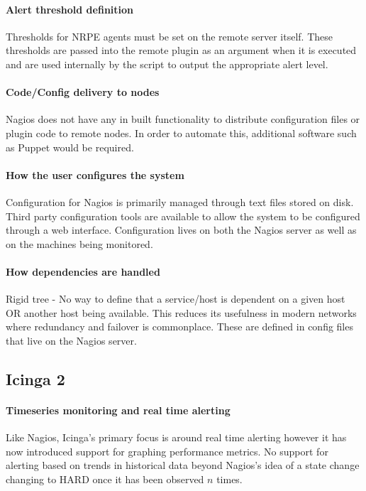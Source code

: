\documentclass[bsc,logo,twoside]{infthesis}
\begin{document}
\paragraph*{Alert threshold definition}
Thresholds for NRPE agents must be set on the remote server itself.  These
thresholds are passed into the remote plugin as an argument when it is executed
and are used internally by the script to output the appropriate alert level.

\paragraph*{Code/Config delivery to nodes}
Nagios does not have any in built functionality to distribute configuration
files or plugin code to remote nodes. In order to automate this, additional
software such as Puppet would be required.

\paragraph*{How the user configures the system}
Configuration for Nagios is primarily managed through text files stored on disk.
Third party configuration tools are available to allow the system to be
configured through a web interface. Configuration lives on both the Nagios
server as well as on the machines being monitored.

\paragraph*{How dependencies are handled}
Rigid tree - No way to define that a service/host is dependent on a given host
OR another host being available.  This reduces its usefulness in modern networks
where redundancy and failover is commonplace. These are defined in config files
that live on the Nagios server.

\subsection{Icinga 2}
\paragraph*{Timeseries monitoring and real time alerting}
Like Nagios, Icinga's primary focus is around real time alerting however it has
now introduced support for graphing performance metrics.  No support for alerting
based on trends in historical data beyond Nagios's idea of a state change
changing to HARD once it has been observed $n$ times.
\end{document}
